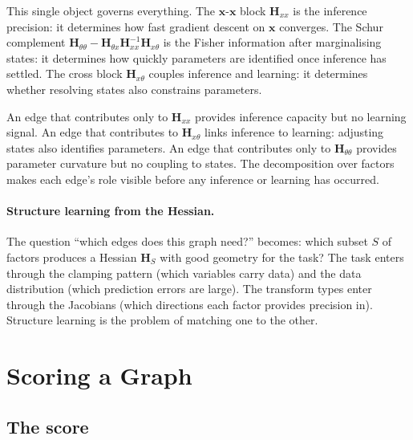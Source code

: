 \documentclass[11pt, a4paper]{article}
\newcommand{\bx}{\bm{x}}
\begin{document}
This single object governs everything.
The $\bx$-$\bx$ block $\bm{H}_{xx}$ is the inference precision: it determines how fast gradient descent on $\bx$ converges.
The Schur complement $\bm{H}_{\theta\theta} - \bm{H}_{\theta x}\bm{H}_{xx}^{-1}\bm{H}_{x\theta}$ is the Fisher information after marginalising states: it determines how quickly parameters are identified once inference has settled.
The cross block $\bm{H}_{x\theta}$ couples inference and learning: it determines whether resolving states also constrains parameters.

An edge that contributes only to $\bm{H}_{xx}$ provides inference capacity but no learning signal.
An edge that contributes to $\bm{H}_{x\theta}$ links inference to learning: adjusting states also identifies parameters.
An edge that contributes only to $\bm{H}_{\theta\theta}$ provides parameter curvature but no coupling to states.
The decomposition over factors makes each edge's role visible before any inference or learning has occurred.

\paragraph{Structure learning from the Hessian.}
The question ``which edges does this graph need?'' becomes: which subset $S$ of factors produces a Hessian $\bm{H}_S$ with good geometry for the task?
The task enters through the clamping pattern (which variables carry data) and the data distribution (which prediction errors are large).
The transform types enter through the Jacobians (which directions each factor provides precision in).
Structure learning is the problem of matching one to the other.

\section{Scoring a Graph}

\subsection{The score}
\end{document}

